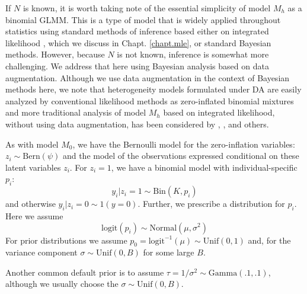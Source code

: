 If $N$ is known, it is worth taking note of the essential simplicity
of model $M_h$ as a binomial GLMM.  This is a type of model that is
widely applied throughout statistics using
standard methods of inference based either on integrated likelihood
\citep{laird_ware:1982, berger_etal:1999}, which we discuss in
Chapt. \ref{chapt.mle}, or standard Bayesian
methods. However, because $N$ is not known, inference is somewhat more
challenging. We address that here using Bayesian analysis based on
data augmentation. Although we use data augmentation in the context of
Bayesian methods here, we note that
heterogeneity models formulated under DA are easily analyzed by
conventional likelihood methods as zero-inflated binomial mixtures
\citep{royle:2006} and more traditional analysis of model $M_h$ based on
integrated likelihood, without using data augmentation, has been
considered by \citet{coull_agresti:1999}, \citet{dorazio_royle:2003},
and others.

As with model $M_{0}$, we have the Bernoulli model for the
zero-inflation variables: $z_{i} \sim \mbox{Bern}(\psi)$ and the model
of the observations expressed conditional on these latent variables
$z_{i}$. For $z_{i}=1$, we have a binomial model with
individual-specific $p_{i}$:
\[
y_{i}|{z_{i} \! = \! 1} \sim \mbox{Bin}(K,p_{i})
\]
and otherwise $y_{i} |{ z_{i} \! = \! 0} \sim 1(y=0)$. Further, we
prescribe a distribution for $p_{i}$. Here we assume
\[
\mathrm{logit}(p_{i}) \sim \mbox{Normal}(\mu,\sigma^2)
\]
For prior distributions we assume
$p_{0} = \mbox{logit}^{-1}(\mu) \sim
\mbox{Unif}(0,1)$ and, for the variance component
$\sigma \sim \mbox{Unif}(0,B)$ for some large $B$.

Another common default prior is to assume
$\tau = 1/\sigma^{2} \sim \mbox{Gamma}(.1,.1)$, although we usually
choose the $\sigma \sim \mbox{Unif}(0,B)$.



